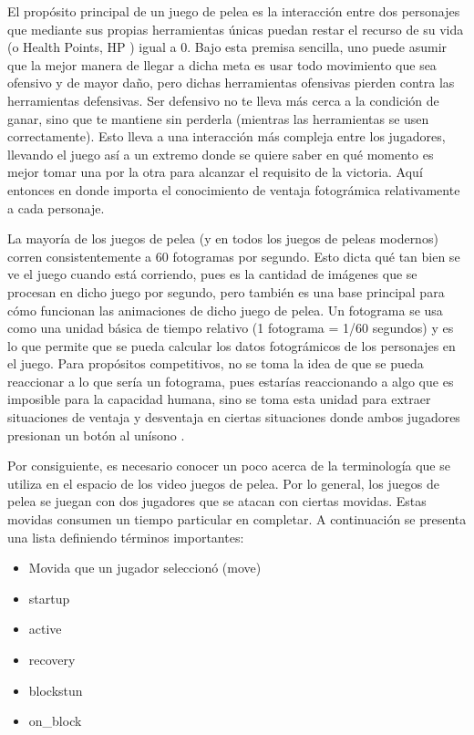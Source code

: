 El propósito principal de un juego de pelea es la interacción entre dos personajes que mediante sus propias herramientas únicas puedan restar el recurso de su vida (o Health Points, HP \cite{noauthor_fighting_nodate-2} ) igual a 0. Bajo esta premisa sencilla, uno puede asumir que la mejor manera de llegar a dicha meta es usar todo movimiento que sea ofensivo y de mayor daño, pero dichas herramientas ofensivas pierden contra las herramientas defensivas. Ser defensivo no te lleva más cerca a la condición de ganar, sino que te mantiene sin perderla (mientras las herramientas se usen correctamente). Esto lleva a una interacción más compleja entre los jugadores, llevando el juego así a un extremo donde se quiere saber en qué momento es mejor tomar una por la otra para alcanzar el requisito de la victoria. Aquí entonces en donde importa el conocimiento de ventaja fotográmica relativamente a cada personaje. 

La mayoría de los juegos de pelea (y en todos los juegos de peleas modernos) corren consistentemente a 60 fotogramas por segundo. Esto dicta qué tan bien se ve el juego cuando está corriendo, pues es la cantidad de imágenes que se procesan en dicho juego por segundo, pero también es una base principal para cómo funcionan las animaciones de dicho juego de pelea. Un fotograma se usa como una unidad básica de tiempo relativo (1 fotograma = 1/60 segundos) y es lo que permite que se pueda calcular los datos fotográmicos de los personajes en el juego. Para propósitos competitivos, no se toma la idea de que se pueda reaccionar a lo que sería un fotograma, pues estarías reaccionando a algo que es imposible para la capacidad humana, sino se toma esta unidad para extraer situaciones de ventaja y desventaja en ciertas situaciones donde ambos jugadores presionan un botón al unísono \cite{core-a_gaming_analysis_2019}.

Por consiguiente, es necesario conocer un poco acerca de la terminología que se utiliza en el espacio de los video juegos de pelea. Por lo general, los juegos de pelea se juegan con dos jugadores que se atacan con ciertas movidas. Estas movidas consumen un tiempo particular en completar. A continuación se presenta una lista definiendo términos importantes:
\begin{itemize}
    \item Movida que un jugador seleccionó (move)
    \item \gls{startup}
    \item \gls{active}
    \item \gls{recovery}
    \item \gls{blockstun}
    \item \gls{on_block}
\end{itemize}


